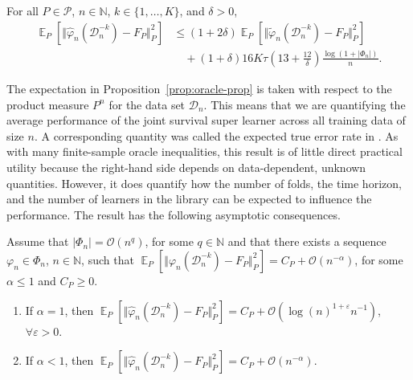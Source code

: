 \documentclass[alpha-refs]{wiley-article}
\DeclareMathOperator{\E}{\mathbb{E}} %
\newcommand{\N}{\mathbb{N}}
\renewcommand{\phi}{\varphi}
\renewcommand{\epsilon}{\varepsilon}
\newcommand\bigO{\ensuremath{\mathcal{O}}}
\newcommand{\1}{\mathds{1}}
\newcommand{\data}{\ensuremath{\mathcal{D}}}
\begin{document}
\begin{proposition}
  \label{prop:oracle-prop}
  For all \(P\in\mathcal{P}\), \( n \in \N \), \( k \in \{1, \dots, K\} \),
  and $\delta>0$,
  \begin{align*}
    \E_{P}{\left[ \Vert \hat{\phi}_n(\data_n^{-k}) - F_P \Vert_{P}^2 \right]}
    & \leq (1 + 2\delta)
      \E_{P}{\left[ \Vert \tilde{\phi}_n(\data_n^{-k}) - F_P \Vert_{P}^2 \right]}
    \\
    & \quad
      + (1+ \delta) 16   K \tau
      \left(
      13 + \frac{12}{\delta}
      \right)
      \frac{\log(1 + |\Phi_n|)}{n}.
  \end{align*}
\end{proposition}

The expectation in Proposition~\ref{prop:oracle-prop} is
taken with respect to the product measure \( P^{n} \) for the data set
\( \data_n \). This means that we are quantifying the average
performance of the joint survival super learner across all training
data of size \(n\). A corresponding quantity was called the expected
true error rate in \cite{efron_and_tibshirani97}. As with many
finite-sample oracle inequalities, this result is of little direct
practical utility because the right-hand side depends on
data-dependent, unknown quantities. However, it does quantify how the
number of folds, the time horizon, and the number of learners in the
library can be expected to influence the performance. The result has
the following asymptotic consequences. 

\begin{corollary}
  \label{cor:asymp-cons}
  Assume that \( |\Phi_n| = \bigO(n^q)\), for some
  \( q \in \N \) and that there exists a sequence
  \( \phi_n \in \Phi_n \), \( n \in \N \), such that
  \(  \E_{P}{\left[ \Vert
      \phi_n(\data_n^{-k}) - F_P \Vert_{P}^2 \right]} = C_P +
  \bigO(n^{-\alpha}) \), for some \( \alpha\leq 1 \) and
  \( C_P \geq 0 \).
  \begin{enumerate}[label=(\alph*)]
  \item\label{item:1} If $\alpha=1$, then
    \(
    \E_{P}{\left[ \Vert
        \hat{\phi}_n(\data_n^{-k}) - F_P \Vert_{P}^2 \right]} = C_P +
    \bigO(\log(n)^{1+\epsilon}n^{-1}) \), $\forall\epsilon>0$.
  \item\label{item:2} If $\alpha<1$, then
    \(
    \E_{P}{\left[ \Vert
        \hat{\phi}_n(\data_n^{-k}) - F_P \Vert_{P}^2 \right]} = C_P +
    \bigO(n^{-\alpha}) \).
  \end{enumerate}
\end{corollary}
\end{document}
